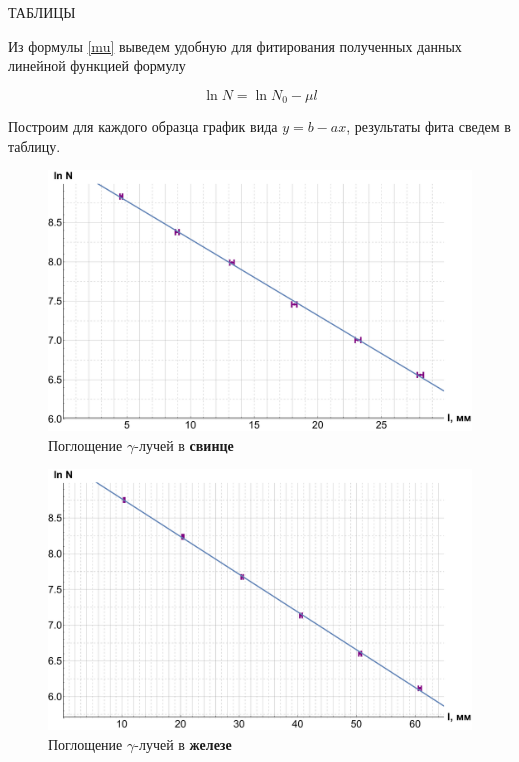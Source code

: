 \documentclass[12pt]{kiarticle}
\newcommand{\ga}{\ensuremath{\gamma}}
\begin{document}
ТАБЛИЦЫ

Из формулы \eqref{mu} выведем удобную для фитирования полученных данных линейной функцией формулу 

 \begin{equation}\label{yotx}
\ln N = \ln N_0 - \mu l
\end{equation}

Построим для каждого образца график вида $ y = b - ax $, результаты фита сведем в таблицу.
 
  	\begin{figure}[h!]
 	\label{graf_pb}
 	\includegraphics[scale=0.47]{pb.pdf}
 	\caption{Поглощение \ga-лучей в \textbf{свинце}}
 \end{figure}

		\begin{figure}[h!]
		\label{graf_fe}
		\includegraphics[scale=0.47]{fe.pdf}
		\caption{Поглощение \ga-лучей в \textbf{железе}}
	\end{figure}
\end{document}
